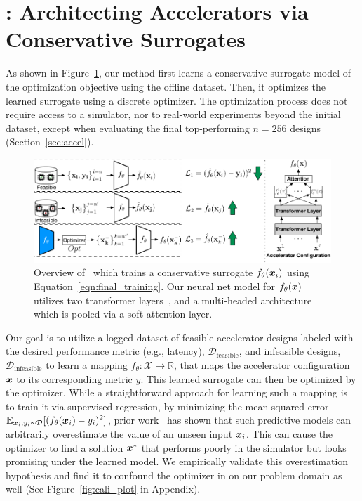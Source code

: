 \section{\primemethodname: Architecting Accelerators via Conservative Surrogates}
\label{sec:method}
%
As shown in Figure~\ref{fig:method}, our method first learns a conservative surrogate model of the optimization objective using the offline dataset.
%
Then, it optimizes the learned surrogate using a discrete optimizer.
%
The optimization process does not require access to a simulator, nor to real-world experiments beyond the initial dataset, except when evaluating the final top-performing $n=256$ designs (Section~\ref{sec:accel}).

\begin{figure}
    \centering
    \vspace{-0.3cm}
    \includegraphics[width=0.95\linewidth]{chapters/prime/figs/overview/mbo-method.pdf}
    \vspace{-0.1cm}
    \caption{\small{Overview of \primemethodname\ which trains a conservative surrogate ${f}_\theta({\boldsymbol{x}}_i)$ using Equation~\ref{eqn:final_training}. Our neural net model for ${f}_\theta({\boldsymbol{x}})$ utilizes two transformer layers~\citep{vaswani2017attention}, and a multi-headed architecture which is pooled via a soft-attention layer.}}
    \vspace{-0.3cm}
    \label{fig:method}
\end{figure}
Our goal is to utilize a logged dataset of feasible accelerator designs labeled with the desired performance metric (e.g., latency),  $\mathcal{D}_\text{feasible}$, and infeasible designs,  $\mathcal{D}_\text{infeasible}$ to learn a mapping ${f}_\theta: \mathcal{X} \rightarrow \mathbb{R}$, that maps the accelerator configuration ${\boldsymbol{x}}$ to its corresponding metric $y$. This learned surrogate can then be optimized by the optimizer. While a straightforward approach for learning such a mapping is to train it via supervised regression, by minimizing the mean-squared error $\mathbb{E}_{{\boldsymbol{x}}_i, y_i \sim \mathcal{D}}[(f_\theta({\boldsymbol{x}}_i) - y_i)^2]$, prior work~\citep{kumar2019model,kumar2020conservative,trabucco2021conservative} has shown that such predictive models can arbitrarily overestimate the value of an unseen input ${\boldsymbol{x}}_i$. This can cause the optimizer to find a solution ${\boldsymbol{x}}^*$ that performs poorly in the simulator but looks promising under the learned model. We empirically validate this overestimation hypothesis and find it to confound the optimizer in on our problem domain as well (See Figure~\ref{fig:cali_plot} in Appendix). 
